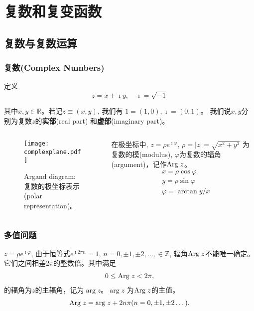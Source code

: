 \section{复数和复变函数}

\subsection{复数与复数运算}

\begin{frame}
\frametitle{复数(Complex Numbers)}

\begin{block}{定义}
    \begin{equation*}
        z = x + \imath y, \quad \imath = \sqrt{-1}
    \end{equation*} 
\end{block}
其中$x,y \in {\mathbb{R}}$。若记$z \equiv (x,y)$, 我们有
$1 = (1,0), \imath = (0, 1)$。
我们说$x,y$分别为复数$z$的{\bf 实部}(real part) 和{\bf 虚部}(imaginary part)。
\begin{columns}
\begin{column}{0.6\textwidth}
    \begin{figure}
        \texttt{[image: complexplane.pdf]}
        \caption{Argand diagram:复数的极坐标表示(polar representation)。}
    \end{figure}
\end{column}
\begin{column}{0.4\textwidth}   
     在极坐标中, $z=\rho e^{\imath \varphi}$, $\rho = |z|=\sqrt{x^2 + y^2}$ 为复数的模(modulus), $\varphi$为复数的辐角(argument)，记作${\mathrm{Arg}\;} z$。
    \begin{align*}
        & x = \rho \cos\varphi \\
        & y = \rho \sin\varphi \\
        & \varphi = \arctan y/x
    \end{align*}
\end{column}
\end{columns}
\end{frame}


\begin{frame}
    \frametitle{多值问题}
$z=\rho e^{\imath \varphi}$, 由于恒等式$e^{\imath 2\pi n} = 1$, $n = 0, \pm 1, \pm 2, \dots, \in \mathbb{Z}$, 辐角${\mathrm{Arg}\;} z$不能唯一确定。
它们之间相差$2\pi$的整数倍。其中满足
\begin{align*}
    0 \leq {\mathrm{Arg}\;} z < 2\pi,
\end{align*}
的辐角为$z$的主辐角，记为$\arg z$。$\arg z$ 为${\mathrm{Arg}\;} z$的主值。
\begin{align*}
    {\mathrm{Arg}\;} z = {\mathrm{arg}\;} z + 2 n \pi (n = 0, \pm 1, \pm 2\dots).
\end{align*}

\end{frame}


